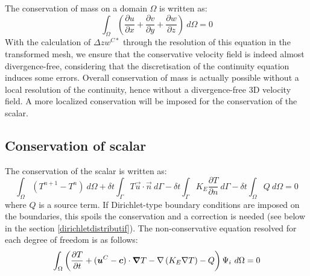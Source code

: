 The conservation of mass on a domain $\Omega$ is written as:
\begin{equation}
{\displaystyle\int\nolimits_{\Omega}}
\left(\dfrac{\partial u}{\partial x}+\dfrac{\partial v}{\partial y}
+\dfrac{\partial w}{\partial z}\right) ~ d\Omega=0
\end{equation}
With the calculation of $\Delta zw^{C*}$ through the resolution of this
equation in the transformed mesh, we ensure that the conservative
velocity field is indeed almost divergence-free, considering
that the discretisation of the continuity equation induces some errors.
Overall conservation of mass is actually possible without a local
resolution of the continuity, hence without a divergence-free
3D velocity field. A more localized conservation will be imposed
for the conservation of the scalar.

\subsection{\label{masse traceur}Conservation of scalar
}

The conservation of the scalar is written as:
\begin{equation}
\int_{\Omega}(T^{n+1}-T^{n})~d\Omega+\delta t\int_{\Gamma}T\vec{u}\cdot
\vec{n}~d\Gamma-\delta t\int_{\Gamma}K_{E}\dfrac{\partial T}{\partial n}
~d\Gamma-\delta t\int_{\Omega}Q~d\Omega=0
\label{eq:conservationTraceur}
\end{equation}
where $Q$ is a source term. If Dirichlet-type boundary conditions
are imposed on the boundaries, this spoils the conservation and
a correction is needed
(see below in the section \ref{dirichletdistributif}).
The non-conservative equation resolved for each degree of
freedom is as follows:
\begin{equation}
\int_{\Omega}\left(\dfrac{\partial T}{\partial t}+(\bm{u}^C-\bm{c})
\cdot\bm{\nabla} T-\nabla\left(K_{E}\nabla T\right)-Q\right)\Psi_{i}~d\Omega=0
\end{equation}

